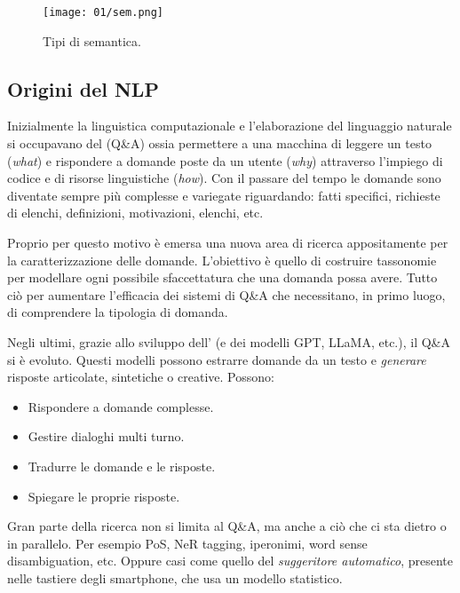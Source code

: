 \begin{figure}[h]
    \centering
    \texttt{[image: 01/sem.png]}
    \caption{Tipi di semantica.}
    \label{fig:sem}

  \end{figure}

\subsection{Origini del NLP}

Inizialmente la linguistica computazionale e l'elaborazione del linguaggio naturale si occupavano del  (Q\&A) ossia permettere a una macchina di leggere un testo (\textit{what}) e rispondere a domande poste da un utente (\textit{why}) attraverso l'impiego di codice e di risorse linguistiche (\textit{how}). Con il passare del tempo le domande sono diventate sempre più complesse e variegate riguardando: fatti specifici, richieste di elenchi, definizioni, motivazioni, elenchi, etc.  

Proprio per questo motivo è emersa una nuova area di ricerca appositamente per la caratterizzazione delle domande. L'obiettivo è quello di costruire tassonomie per modellare ogni possibile sfaccettatura che una domanda possa avere. Tutto ciò per aumentare l'efficacia dei sistemi di Q\&A che necessitano, in primo luogo, di comprendere la tipologia di domanda. 

Negli ultimi, grazie allo sviluppo dell' (e dei modelli GPT, LLaMA, etc.), il Q\&A si è evoluto. Questi modelli possono estrarre domande da un testo e \textit{generare} risposte articolate, sintetiche o creative. Possono:
\begin{itemize}
  \item Rispondere a domande complesse. 
  \item Gestire dialoghi multi turno. 
  \item Tradurre le domande e le risposte. 
  \item Spiegare le proprie risposte.
\end{itemize}


Gran parte della ricerca non si limita al Q\&A, ma anche a ciò che ci sta dietro o in parallelo. Per esempio PoS, NeR tagging, iperonimi, word sense disambiguation, etc.  Oppure casi come quello del \textit{suggeritore automatico}, presente nelle tastiere degli smartphone, che usa un modello statistico.


